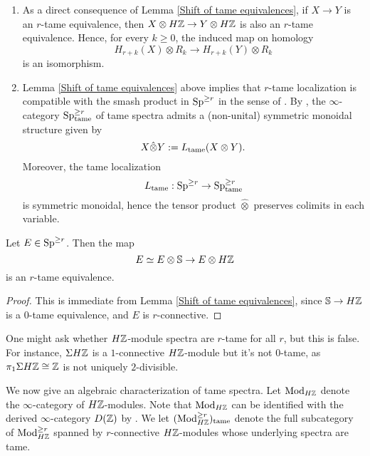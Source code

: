 \begin{remark}
\label{symmetric monoidal structure on tame spectra}
\begin{enumerate}
 	\item As a direct consequence of Lemma \ref{Shift of tame equivalences}, if $X\to Y$ is an $r$-tame equivalence, then $X\otimes H{\mathbb{Z}} \to Y\otimes H{\mathbb{Z}}$ is also an $r$-tame equivalence. Hence, for every $k\geq 0$, the induced map on homology
 	\[
 	H_{r+k}(X)\otimes R_{k}
 	\to
 	H_{r+k}(Y)\otimes R_{k}
 	\]
 	is an isomorphism.
	\item Lemma \ref{Shift of tame equivalences} above implies that $r$-tame localization is compatible with the smash product in $\operatorname{Sp}^{\geq r}$ in the sense of \cite[Definition 2.2.1.6.]{HA}. By \cite[Proposition 2.2.1.9.]{HA}, the $\infty$-category $\operatorname{Sp}^{\geq r}_{\operatorname{\operatorname{tame}}}$ of tame spectra admits a (non-unital) symmetric monoidal structure given by 
$$
X\hat{\otimes} Y := L_{\operatorname{\operatorname{tame}}}(X\otimes Y).
$$
Moreover, the tame localization 
$$
L_{\operatorname{\operatorname{tame}}}: \operatorname{Sp}^{\geq r} \to 
\operatorname{Sp}^{\geq r}_{\operatorname{\operatorname{tame}}}
$$
is symmetric monoidal, hence the tensor product $\hat{\otimes}$ preserves colimits in each variable.
\end{enumerate}

\end{remark}

\begin{corollary}
\label{HZ commutes with tame localization}
	Let $E\in \operatorname{Sp}^{\geq r}$. Then the map
	$$
	E \simeq E\otimes {\mathbb{S}}  \to E\otimes H{\mathbb{Z}}
	$$ 
	is an $r$-tame equivalence.
\end{corollary}
\begin{proof}
	This is immediate from Lemma \ref{Shift of tame equivalences}, since ${\mathbb{S}} \to H{\mathbb{Z}}$ is a $0$-tame equivalence, and $E$ is $r$-connective.
\end{proof}


\begin{remark}
One might ask whether $H{\mathbb{Z}}$-module spectra are $r$-tame for all $r$, but this is false. For instance, $\Sigma H{\mathbb{Z}}$ is a $1$-connective $H{\mathbb{Z}}$-module but it's not $0$-tame, as $\pi_{1}\Sigma H{\mathbb{Z}}\cong {\mathbb{Z}}$ is not uniquely $2$-divisible.
\end{remark}

We now give an algebraic characterization of tame spectra. 
Let $\operatorname{Mod}_{H{\mathbb{Z}}}$ denote the $\infty$-category of $H{\mathbb{Z}}$-modules. Note that $\operatorname{Mod}_{H{\mathbb{Z}}}$ can be identified with the derived $\infty$-category $D({\mathbb{Z}})$ by \cite[Remark 7.1.1.16.]{HA}.
We let $(\operatorname{Mod}^{\geq r}_{H{\mathbb{Z}}})_{\operatorname{\operatorname{tame}}}$ denote the full subcategory of $\operatorname{Mod}^{\geq r}_{H{\mathbb{Z}}}$
spanned by $r$-connective $H{\mathbb{Z}}$-modules whose underlying spectra are tame.

